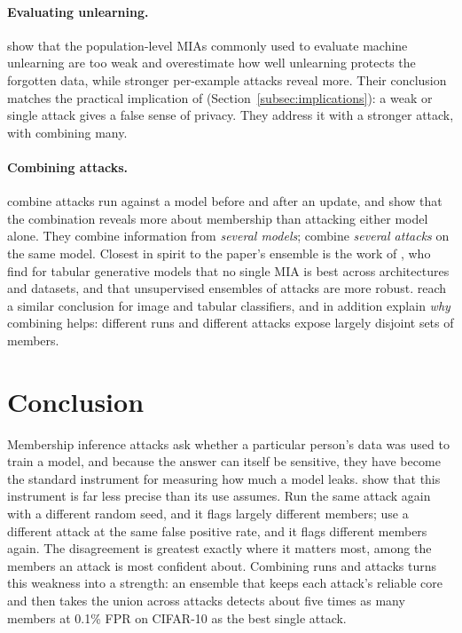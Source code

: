 \documentclass[a4paper]{article}
\begin{document}
\paragraph{Evaluating unlearning.}
\citet{hayes2024inexact} show that the population-level MIAs commonly used to evaluate machine unlearning are too weak and overestimate how well unlearning protects the forgotten data, while stronger per-example attacks reveal more.
Their conclusion matches the practical implication of \citet[Sec.~4.6]{wang2025mia} (Section~\ref{subsec:implications}): a weak or single attack gives a false sense of privacy.
They address it with a stronger attack, \citet{wang2025mia} with combining many.

\paragraph{Combining attacks.}
\citet{jagielski2023combine} combine attacks run against a model before and after an update, and show that the combination reveals more about membership than attacking either model alone.
They combine information from \emph{several models}; \citet{wang2025mia} combine \emph{several attacks} on the same model.
Closest in spirit to the paper's ensemble is the work of \citet{ward2025ensembling}, who find for tabular generative models that no single MIA is best across architectures and datasets, and that unsupervised ensembles of attacks are more robust.
\citet{wang2025mia} reach a similar conclusion for image and tabular classifiers, and in addition explain \emph{why} combining helps: different runs and different attacks expose largely disjoint sets of members.


\section{Conclusion}
\label{sec:conclusion}

Membership inference attacks ask whether a particular person's data was used to train a model, and because the answer can itself be sensitive, they have become the standard instrument for measuring how much a model leaks.
\citet{wang2025mia} show that this instrument is far less precise than its use assumes.
Run the same attack again with a different random seed, and it flags largely different members; use a different attack at the same false positive rate, and it flags different members again.
The disagreement is greatest exactly where it matters most, among the members an attack is most confident about.
Combining runs and attacks turns this weakness into a strength: an ensemble that keeps each attack's reliable core and then takes the union across attacks detects about five times as many members at 0.1\% FPR on CIFAR-10 as the best single attack.
\end{document}

